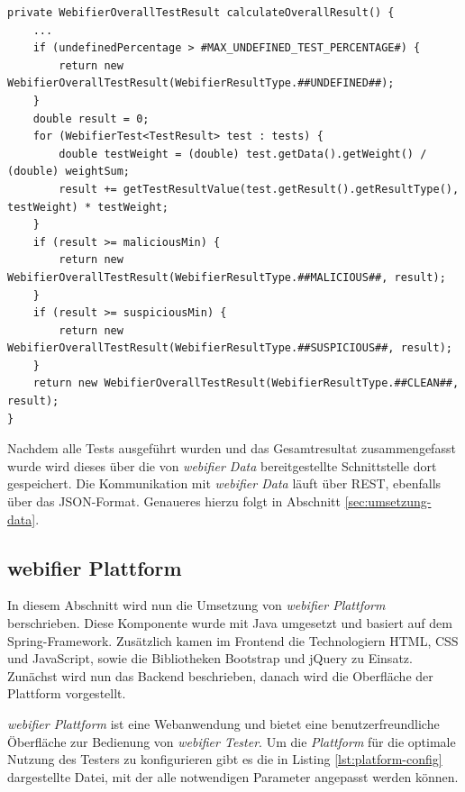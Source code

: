 \begin{scriptsize}
\begin{lstlisting}
private WebifierOverallTestResult calculateOverallResult() {
    ...
    if (undefinedPercentage > #MAX_UNDEFINED_TEST_PERCENTAGE#) {
        return new WebifierOverallTestResult(WebifierResultType.##UNDEFINED##);
    }
    double result = 0;
    for (WebifierTest<TestResult> test : tests) {
        double testWeight = (double) test.getData().getWeight() / (double) weightSum;
        result += getTestResultValue(test.getResult().getResultType(), testWeight) * testWeight;
    }
    if (result >= maliciousMin) {
        return new WebifierOverallTestResult(WebifierResultType.##MALICIOUS##, result);
    }
    if (result >= suspiciousMin) {
        return new WebifierOverallTestResult(WebifierResultType.##SUSPICIOUS##, result);
    }
    return new WebifierOverallTestResult(WebifierResultType.##CLEAN##, result);
}
\end{lstlisting}
\end{scriptsize}

Nachdem alle Tests ausgeführt wurden und das Gesamtresultat zusammengefasst wurde wird dieses über
die von \textit{webifier Data} bereitgestellte Schnittstelle dort gespeichert. Die Kommunikation mit
\textit{webifier Data} läuft über \ac{REST}, ebenfalls über das \ac{JSON}-Format. Genaueres hierzu
folgt in Abschnitt \ref{sec:umsetzung-data}.

\subsection{webifier Plattform}

In diesem Abschnitt wird nun die Umsetzung von \textit{webifier Plattform} berschrieben. Diese
Komponente wurde mit Java umgesetzt und basiert auf dem Spring-Framework. Zusätzlich kamen im Frontend die Technologiern \ac{HTML}, \ac{CSS} und JavaScript, sowie die Bibliotheken Bootstrap und jQuery zu Einsatz. Zunächst wird nun das Backend beschrieben, danach wird die Oberfläche der Plattform vorgestellt.

\textit{webifier Plattform} ist eine Webanwendung und bietet eine benutzerfreundliche Öberfläche zur
Bedienung von \textit{webifier Tester}. Um die \textit{Plattform} für die optimale Nutzung des
Testers zu konfigurieren gibt es die in Listing \ref{lst:platform-config} dargestellte Datei, mit der alle notwendigen Parameter angepasst werden können.

